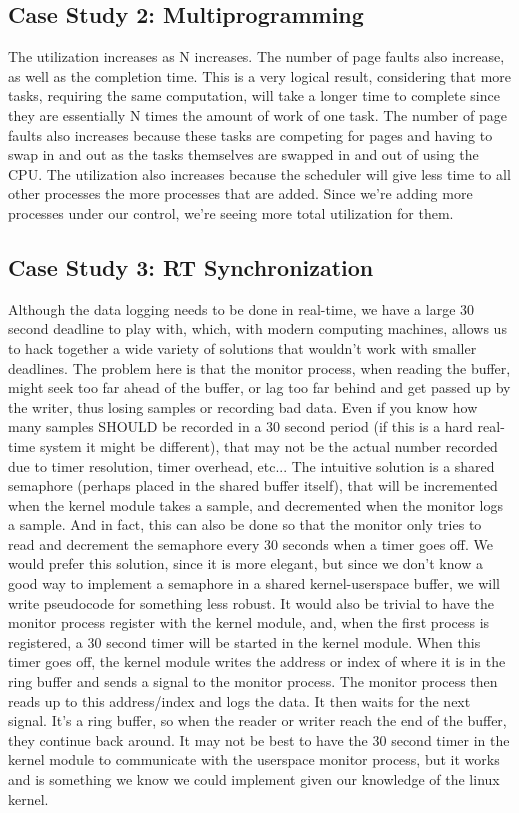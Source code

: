 \documentclass{article}
\begin{document}
\subsection{Case Study 2: Multiprogramming}
The utilization increases as N increases. The number of page faults also increase, as well as the completion time. This is a very logical result, considering that more tasks, requiring the same computation, will take a longer time to complete since they are essentially N times the amount of work of one task. The number of page faults also increases because these tasks are competing for pages and having to swap in and out as the tasks themselves are swapped in and out of using the CPU. The utilization also increases because the scheduler will give less time to all other processes the more processes that are added. Since we're adding more processes under our control, we're seeing more total utilization for them.

\subsection{Case Study 3: RT Synchronization}
Although the data logging needs to be done in real-time, we have a large 30 second deadline to play with, which, with modern computing machines, allows us to hack together a wide variety of solutions that wouldn't work with smaller deadlines. The problem here is that the monitor process, when reading the buffer, might seek too far ahead of the buffer, or lag too far behind and get passed up by the writer, thus losing samples or recording bad data. Even if you know how many samples SHOULD be recorded in a 30 second period (if this is a hard real-time system it might be different), that may not be the actual number recorded due to timer resolution, timer overhead, etc... The intuitive solution is a shared semaphore (perhaps placed in the shared buffer itself), that will be incremented when the kernel module takes a sample, and decremented when the monitor logs a sample. And in fact, this can also be done so that the monitor only tries to read and decrement the semaphore every 30 seconds when a timer goes off. We would prefer this solution, since it is more elegant, but since we don't know a good way to implement a semaphore in a shared kernel-userspace buffer, we will write pseudocode for something less robust. It would also be trivial to have the monitor process register with the kernel module, and, when the first process is registered, a 30 second timer will be started in the kernel module. When this timer goes off, the kernel module writes the address or index of where it is in the ring buffer and sends a signal to the monitor process. The monitor process then reads up to this address/index and logs the data. It then waits for the next signal. It's a ring buffer, so when the reader or writer reach the end of the buffer, they continue back around. It may not be best to have the 30 second timer in the kernel module to communicate with the userspace monitor process, but it works and is something we know we could implement given our knowledge of the linux kernel. \\
\end{document}
